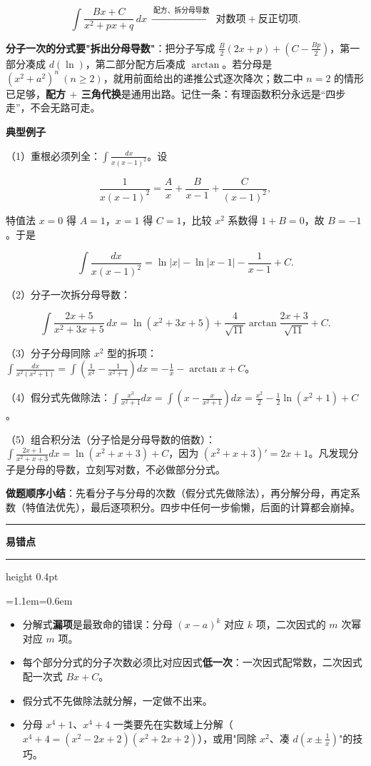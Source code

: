 \documentclass[11pt,openany,UTF8]{ctexbook}
\newcommand{\callouthead}[2]{%
  \par\addvspace{7pt}\noindent
  {\color{#1}\rule[-0.15em]{3pt}{1.05em}}\hspace{0.5em}%
  {\bfseries\color{#1}#2}\par\nobreak\vspace{-0.35em}%
  {\color{rulesep}\hrule height 0.4pt}\nobreak\vspace{0.45em}%
  \begingroup\small\setlength{\parindent}{0pt}%
  \leftskip=1.1em\rightskip=0.6em\noindent\ignorespaces}
\newcommand{\calloutend}{\par\endgroup\addvspace{7pt}}
\newenvironment{callwarn}[1]{\callouthead{warnbar}{#1}}{\calloutend}
\begin{document}
\[\int\frac{Bx+C}{x^2+px+q}\,dx\ \xrightarrow{\ \text{配方、拆分母导数}\ }\ \text{对数项}+\text{反正切项}.\]

\textbf{分子一次的分式要"拆出分母导数"}：把分子写成 $\frac{B}{2}\left(2x+p\right)+\left(C-\frac{Bp}{2}\right)$，第一部分凑成 $d(\ln)$，第二部分配方后凑成 $\arctan$。若分母是 $(x^2+a^2)^n\ (n\geq2)$，就用前面给出的递推公式逐次降次；数二中 $n=2$ 的情形已足够，\textbf{配方 $+$ 三角代换}是通用出路。记住一条：有理函数积分永远是“四步走”，不会无路可走。

\textbf{典型例子}

（1）重根必须列全：$\displaystyle\int\frac{dx}{x(x-1)^2}$。设

\[\frac{1}{x(x-1)^2}=\frac{A}{x}+\frac{B}{x-1}+\frac{C}{(x-1)^2},\]

特值法 $x=0$ 得 $A=1$，$x=1$ 得 $C=1$，比较 $x^2$ 系数得 $1+B=0$，故 $B=-1$。于是

\[\int\frac{dx}{x(x-1)^2}=\ln\lvert x\rvert-\ln\lvert x-1\rvert-\frac{1}{x-1}+C.\]

（2）分子一次拆分母导数：

\[\int\frac{2x+5}{x^2+3x+5}\,dx=\ln\left(x^2+3x+5\right)+\frac{4}{\sqrt{11}}\arctan\frac{2x+3}{\sqrt{11}}+C.\]

（3）分子分母同除 $x^2$ 型的拆项：$\displaystyle\int\frac{dx}{x^2(x^2+1)}=\int\left(\frac{1}{x^2}-\frac{1}{x^2+1}\right)dx=-\frac{1}{x}-\arctan x+C$。

（4）假分式先做除法：$\displaystyle\int\frac{x^3}{x^2+1}dx=\int\left(x-\frac{x}{x^2+1}\right)dx=\frac{x^2}{2}-\frac{1}{2}\ln\left(x^2+1\right)+C$。

（5）组合积分法（分子恰是分母导数的倍数）：$\displaystyle\int\frac{2x+1}{x^2+x+3}dx=\ln\left(x^2+x+3\right)+C$，因为 $(x^2+x+3)'=2x+1$。凡发现分子是分母的导数，立刻写对数，不必做部分分式。

\textbf{做题顺序小结}：先看分子与分母的次数（假分式先做除法），再分解分母，再定系数（特值法优先），最后逐项积分。四步中任何一步偷懒，后面的计算都会崩掉。

\begin{callwarn}{易错点}
\begin{itemize}
\item 分解式\textbf{漏项}是最致命的错误：分母 $(x-a)^k$ 对应 $k$ 项，二次因式的 $m$ 次幂对应 $m$ 项。
\item 每个部分分式的分子次数必须比对应因式\textbf{低一次}：一次因式配常数，二次因式配一次式 $Bx+C$。
\item 假分式不先做除法就分解，一定做不出来。
\item 分母 $x^4+1$、$x^4+4$ 一类要先在实数域上分解（$x^4+4=(x^2-2x+2)(x^2+2x+2)$），或用"同除 $x^2$、凑 $d\left(x\pm\frac{1}{x}\right)$"的技巧。
\end{itemize}
\end{callwarn}
\end{document}
